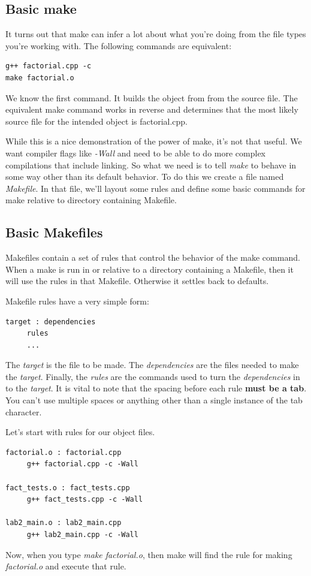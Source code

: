 \documentclass[]{tufte-handout}
\begin{document}
\subsection{Basic make}

It turns out that make can infer a lot about what you're doing from the file types you're working with.  The following commands are equivalent:
\begin{verbatim}
g++ factorial.cpp -c
make factorial.o
\end{verbatim}
We know the first command. It builds the object from from the source file. The equivalent make command works in reverse and determines that the most likely source file for the intended object is factorial.cpp. 

While this is a nice demonstration of the power of make, it's not that useful. We want compiler flags like \textit{-Wall} and need to be able to do more complex compilations that include linking.  So what we need is to tell \textit{make} to behave in some way other than its default behavior. To do this we create a file named \textit{Makefile}. In that file, we'll layout some rules and define some basic commands for make relative to directory containing Makefile.


\subsection{Basic Makefiles}


Makefiles contain a set of rules that control the behavior of the make command. When a make is run in or relative to a directory containing a Makefile, then it will use the rules in that Makefile. Otherwise it settles back to defaults.

Makefile rules have a very simple form:
\begin{verbatim}
target : dependencies
     rules
     ...
\end{verbatim}
The \textit{target} is the file to be made. The \textit{dependencies} are the files needed to make the \textit{target}. Finally, the \textit{rules} are the commands used to turn the \textit{dependencies} in to the \textit{target}.  It is vital to note that the spacing before each rule \textbf{must be a tab}.  You can't use multiple spaces or anything other than a single instance of the tab character.

Let's start with rules for our object files.
\begin{verbatim}
factorial.o : factorial.cpp
     g++ factorial.cpp -c -Wall
     
fact_tests.o : fact_tests.cpp
     g++ fact_tests.cpp -c -Wall

lab2_main.o : lab2_main.cpp
     g++ lab2_main.cpp -c -Wall
\end{verbatim}
Now, when you type \textit{make factorial.o}, then make will find the rule for making \textit{factorial.o} and execute that rule. 
\end{document}
